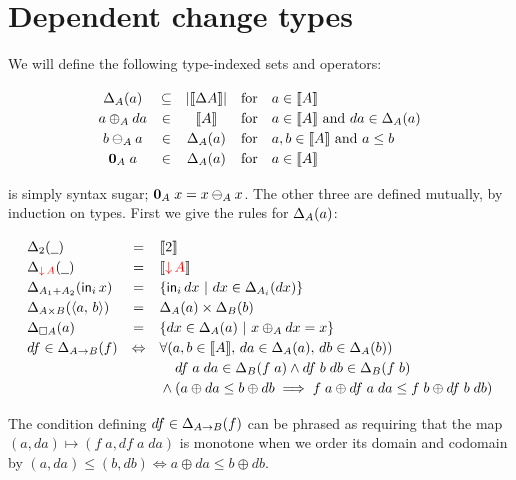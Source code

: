 \documentclass{article}
\begin{document}

\section{Dependent change types}

We will define the following type-indexed sets and operators:

\[\begin{array}{ccccl}
  \Changes{A}{a} &\subseteq& |\Den{\Ch{A}}|
  &\text{for}& a \in \Den{A}
  \\
  a \oplus_A da &\in& \Den{A}
  &\text{for}& a \in \Den{A} ~\text{and}~ da \in \Changes{A}{a}
  \\
  b \ominus_A a &\in& \Changes{A}{a}
  &\text{for}& a, b \in \Den{A} ~\text{and}~ a \le b
  \\
  \zero_A\; a &\in& \Changes{A}{a}
  &\text{for}& a \in \Den{A}
\end{array}\]

\zero{} is simply syntax sugar; $\mathbf{0}_A\; x = x \ominus_A x$. The other three
are defined mutually, by induction on types. First we give the rules for
$\Delta_{A}({a})$:

\[
\def\arraystretch{1.2}
\begin{array}{lcl}
  \Changes{\tbool}{\pwild} &=& \Den{\tbool}
  \\
  \Changes{\Down{A}}{\pwild} &=& \Den{\Down{A}}
  \\
  \Changes{A_1 + A_2}{\inj{i}{x}}
  &=& \setfor{\inj{i}{dx}}{dx \in \Changes{A_i}{dx}}
  \\
  \Changes{A \x B}{\pair{a}{b}}
  &=& \Changes{A}{a} \x \Changes{B}{b}
  \\
  \Changes{\Disc{A}}{a}
  &=& \setfor{dx \in \Changes{A}{a}}{x \oplus_A dx = x}
  \\
  df \in \Changes{A \to B}{f}
  &\Leftrightarrow&
  \forall({a,b \in \Den{A}},\, da \in \Changes{A}{a},\, db \in \Changes{A}{b})\\
  &&\phantom{{}\wedge{}}
  df\; a\; da \in \Changes{B}{f\; a}
  \wedge df\;b\;db \in \Changes{B}{f\; b}
  \\
  &&{}\wedge (a \oplus da \le b \oplus db \implies
  f\;a \oplus df\;a\;da \le f\;b \oplus df\;b\;db)
\end{array}
\]

The condition defining $df \in \Delta_{A \to B}({f})$ can be phrased as requiring
that the map $(a, da) \mapsto (f\;a, df\;a\;da)$ is monotone when we order its
domain and codomain by $(a,da) \le (b,db) \iff a \oplus da \le b \oplus db$.
\end{document}
